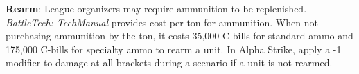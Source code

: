\item {\bfseries Rearm}: League organizers may require ammunition to be replenished.
\emph{BattleTech: TechManual} provides cost per ton for ammunition.
When not purchasing ammunition by the ton, it costs 35,000 C-bills for standard ammo and 175,000 C-bills for specialty ammo to rearm a unit.
In Alpha Strike, apply a -1 modifier to damage at all brackets during a scenario if a unit is not rearmed.
